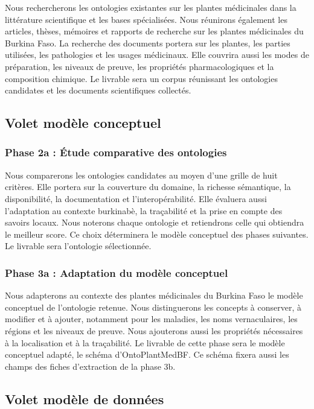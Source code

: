 Nous rechercherons les ontologies existantes sur les plantes médicinales dans la littérature scientifique et les bases spécialisées. Nous réunirons également les articles, thèses, mémoires et rapports de recherche sur les plantes médicinales du Burkina Faso. La recherche des documents portera sur les plantes, les parties utilisées, les pathologies et les usages médicinaux. Elle couvrira aussi les modes de préparation, les niveaux de preuve, les propriétés pharmacologiques et la composition chimique. Le livrable sera un corpus réunissant les ontologies candidates et les documents scientifiques collectés.

\subsection*{Volet modèle conceptuel}

\subsubsection*{Phase 2a : Étude comparative des ontologies}

Nous comparerons les ontologies candidates au moyen d'une grille de huit critères. Elle portera sur la couverture du domaine, la richesse sémantique, la disponibilité, la documentation et l'interopérabilité. Elle évaluera aussi l'adaptation au contexte burkinabè, la traçabilité et la prise en compte des savoirs locaux. Nous noterons chaque ontologie et retiendrons celle qui obtiendra le meilleur score. Ce choix déterminera le modèle conceptuel des phases suivantes. Le livrable sera l'ontologie sélectionnée.

\subsubsection*{Phase 3a : Adaptation du modèle conceptuel}

Nous adapterons au contexte des plantes médicinales du Burkina Faso le modèle conceptuel de l'ontologie retenue. Nous distinguerons les concepts à conserver, à modifier et à ajouter, notamment pour les maladies, les noms vernaculaires, les régions et les niveaux de preuve. Nous ajouterons aussi les propriétés nécessaires à la localisation et à la traçabilité. Le livrable de cette phase sera le modèle conceptuel adapté, le schéma d'OntoPlantMedBF. Ce schéma fixera aussi les champs des fiches d'extraction de la phase 3b.

\subsection*{Volet modèle de données}

